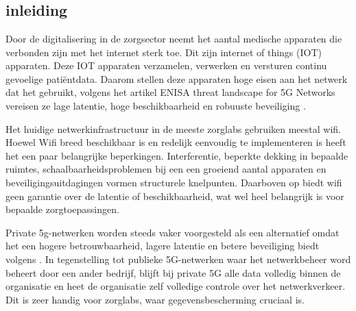 \chapter{}%
\label{ch:stand-van-zaken}



\section{inleiding}

Door de digitalisering in de zorgsector neemt het aantal medische apparaten die verbonden zijn met het internet sterk toe. Dit zijn internet of things (IOT) apparaten. Deze IOT apparaten verzamelen, verwerken en versturen continu gevoelige patiëntdata. Daarom stellen deze apparaten hoge eisen aan het netwerk dat het gebruikt, volgens het artikel ENISA threat landscape for 5G Networks vereisen ze lage latentie, hoge beschikbaarheid en robuuste beveiliging \textcite{ENISA2022}.
\vspace{0.5cm}

Het huidige netwerkinfrastructuur in de meeste zorglabs gebruiken meestal wifi. Hoewel Wifi breed beschikbaar is en redelijk eenvoudig te implementeren is heeft het een paar belangrijke beperkingen. Interferentie, beperkte dekking in bepaalde ruimtes, schaalbaarheidsproblemen bij een een groeiend aantal apparaten en beveiligingsuitdagingen vormen structurele knelpunten. Daarboven op biedt wifi geen garantie over de latentie of beschikbaarheid, wat wel heel belangrijk is voor bepaalde zorgtoepassingen.
\vspace{0.5cm}

Private 5g-netwerken worden steeds vaker voorgesteld als een alternatief omdat het een hogere betrouwbaarheid, lagere latentie en betere beveiliging biedt volgens \autocite{ProximusNXT}. In tegenstelling tot publieke 5G-netwerken waar het netwerkbeheer word beheert door een ander bedrijf, blijft bij private 5G alle data volledig binnen de organisatie en heet de organisatie zelf volledige controle over het netwerkverkeer. Dit is zeer handig voor zorglabs, waar gegevensbescherming cruciaal is.
\vspace{0.5cm}


